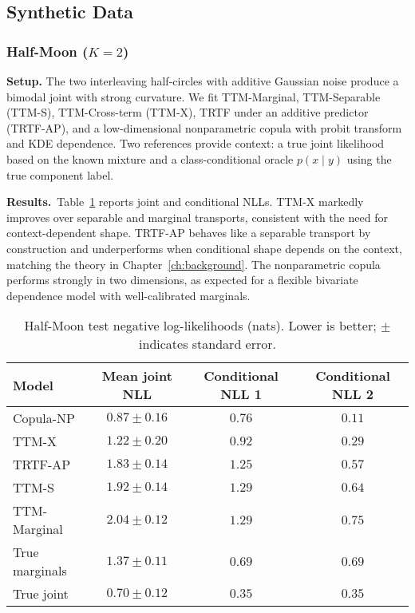\documentclass[11pt,a4paper,twoside]{book}\usepackage[]{graphicx}\usepackage[]{xcolor}
\begin{document}
\subsection{Synthetic Data}

\subsubsection{Half-Moon ($K=2$)}

\textbf{Setup.} The two interleaving half-circles with additive Gaussian noise produce a bimodal joint with strong curvature. We fit TTM-Marginal, TTM-Separable (TTM-S), TTM-Cross-term (TTM-X), TRTF under an additive predictor (TRTF-AP), and a low-dimensional nonparametric copula with probit transform and KDE dependence. Two references provide context: a true joint likelihood based on the known mixture and a class-conditional oracle $p(x\mid y)$ using the true component label.

\textbf{Results.}~Table~\ref{tab:halfmoon-nll} reports joint and conditional NLLs. TTM-X markedly improves over separable and marginal transports, consistent with the need for context-dependent shape. TRTF-AP behaves like a separable transport by construction and underperforms when conditional shape depends on the context, matching the theory in Chapter~\ref{ch:background}. The nonparametric copula performs strongly in two dimensions, as expected for a flexible bivariate dependence model with well-calibrated marginals.

\begin{table}[htbp]
  \centering
  \caption{Half-Moon test negative log-likelihoods (nats). Lower is better; $\pm$ indicates standard error.}
  \label{tab:halfmoon-nll}
  \begin{tabular}{lccc}
    \hline
    Model & Mean joint NLL & Conditional NLL 1 & Conditional NLL 2 \\ 
    \hline
    Copula-NP      & $0.87 \pm 0.16$ & $0.76$ & $0.11$ \\ 
    TTM-X          & $1.22 \pm 0.20$ & $0.92$ & $0.29$ \\ 
    TRTF-AP        & $1.83 \pm 0.14$ & $1.25$ & $0.57$ \\ 
    TTM-S          & $1.92 \pm 0.14$ & $1.29$ & $0.64$ \\ 
    TTM-Marginal   & $2.04 \pm 0.12$ & $1.29$ & $0.75$ \\ 
    True marginals & $1.37 \pm 0.11$ & $0.69$ & $0.69$ \\ 
    True joint     & $0.70 \pm 0.12$ & $0.35$ & $0.35$ \\ 
    \hline
  \end{tabular}
\end{table}
\end{document}
